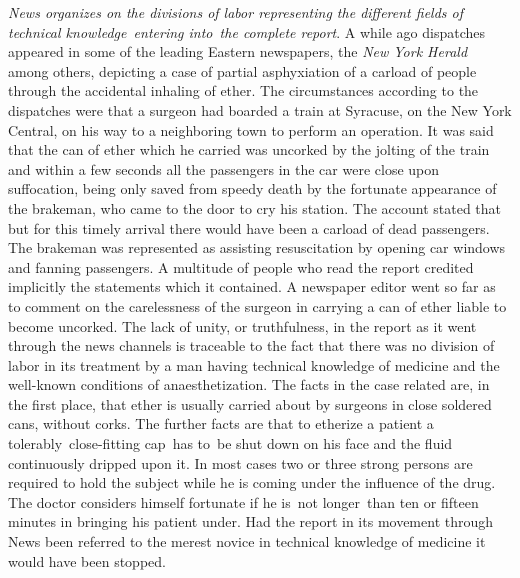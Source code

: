 \documentclass[twoside,symmetric,nobib,justified]{tufte-book}
\begin{document}
\emph{News organizes on the divisions of labor representing the
different fields of technical knowledge~entering into~the complete
report}. A while ago dispatches appeared in some of the leading Eastern
newspapers, the \emph{New York Herald} among others, depicting a case of
partial asphyxiation of a carload of people through the accidental
inhaling of ether. The circumstances according to the dispatches were
that a surgeon had boarded a train at Syracuse, on the New York Central,
on his way to a neighboring town to perform an operation. It was said
that the can of ether which he carried was uncorked by the jolting of
the train and within a few seconds all the passengers in the car were
close upon suffocation, being only saved from speedy death by the
fortunate appearance of the brakeman, who came to the door to cry his
station. The account stated that but for this timely arrival there would
have been a carload of dead passengers. The brakeman was represented as
assisting resuscitation by opening car windows and fanning passengers. A
multitude of people who read the report credited implicitly the
statements which it contained. A newspaper editor went so far as to
comment on the carelessness of the surgeon in carrying a can of ether
liable to become uncorked. The lack of unity, or truthfulness, in the
report as it went through the news channels is traceable to the fact
that there was no division of labor in its treatment by a man having
technical knowledge of medicine and the well-known conditions of
anaesthetization. The facts in the case related are, in the first place,
that ether is usually carried about by surgeons in close soldered cans,
without corks. The further facts are that to etherize a patient a
tolerably~close-fitting cap~has to~be shut down on his face and the
fluid continuously dripped upon it. In most cases two or three strong
persons are required to hold the subject while he is coming under the
influence of the drug. The doctor considers himself fortunate if he
is~not longer~than ten or fifteen minutes in bringing his patient under.
Had the report in its movement through News been referred to the merest
novice in technical knowledge of medicine it would have been stopped.~
\end{document}
